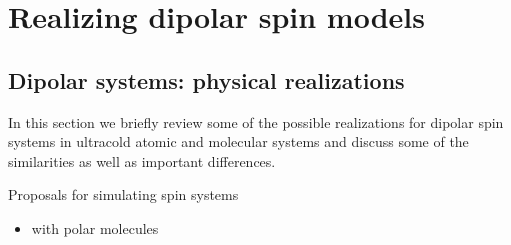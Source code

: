 \chapter{Realizing dipolar spin models}
\label{dipolar_spinmodels}



\section{Dipolar systems: physical realizations}
In this section we briefly review some of the possible realizations for dipolar spin
systems in ultracold atomic and molecular systems and discuss some of the similarities as well as important differences.

Proposals for simulating spin systems
\begin{itemize}
    \item with polar molecules \cite{Micheli2006,Hauke2010,Gorshkov2011,Gorshkov2011b,Peter2012b,Syzranov2014,Peter2014}
\end{itemize}

